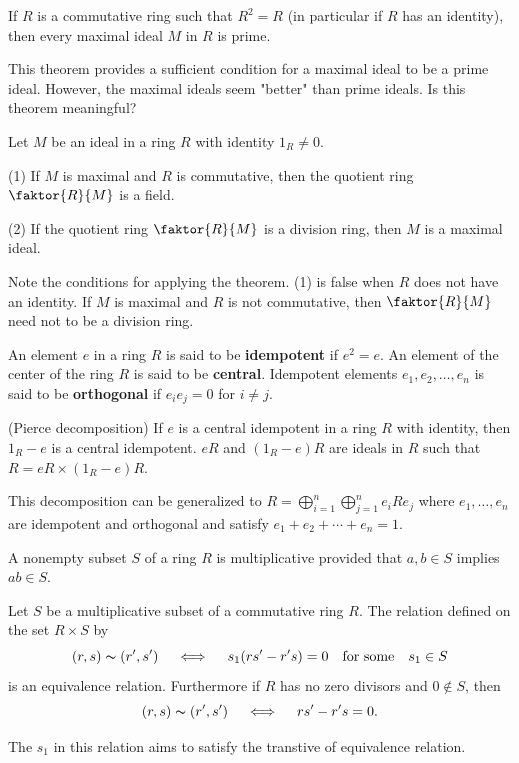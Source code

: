 \documentclass{article}
\begin{document}
\begin{theorem}
    If $R$ is a commutative ring such that $R^2=R$ (in particular if $R$ has an identity), then every maximal ideal $M$ in $R$ is prime.
\end{theorem}

This theorem provides a sufficient condition for a maximal ideal to be a prime ideal. However, the maximal ideals seem "better" than prime ideals. Is this theorem meaningful?

\begin{theorem}
    Let $M$ be an ideal in a ring $R$ with identity $1_R\neq 0$.

    (1) If $M$ is maximal and $R$ is commutative, then the quotient ring $\faktor{R}{M}$ is a field.

    (2) If the quotient ring $\faktor{R}{M}$ is a division ring, then $M$ is a maximal ideal.
\end{theorem}
Note the conditions for applying the theorem. (1) is false when $R$ does not have an identity. If $M$ is maximal and $R$ is not commutative, then $\faktor{R}{M}$ need not to be a division ring.

\begin{definition}
    An element $e$ in a ring $R$ is said to be \textbf{idempotent} if $e^2=e$. An element of the center of the ring $R$ is said to be \textbf{central}. Idempotent elements $e_1, e_{2}, \ldots, e_{n}$ is said to be \textbf{orthogonal} if $e_{i}e_{j}=0$ for $i\neq j$.
\end{definition}

\begin{theorem}(Pierce decomposition)
    If $e$ is a central idempotent in a ring $R$ with identity, then $1_R-e$ is a central idempotent. $eR$ and $(1_R-e)R$ are ideals in $R$ such that $R=eR\times (1_R-e)R$.
\end{theorem}
This decomposition can be generalized to $R=\bigoplus_{i=1}^{n}\bigoplus_{j=1}^{n} e_{i}R e_{j} $ where $e_{1}, \ldots,e_{n}$ are idempotent and orthogonal and satisfy $e_{1}+e_{2}+ \cdots+e_{n}=1$.


\begin{definition}
    A nonempty subset $S$ of a ring $R$ is multiplicative provided that $a,b \in S$ implies $ab \in S$.
\end{definition}

\begin{theorem}
    Let $S$ be a multiplicative subset of a commutative ring $R$. The relation defined on the set $R\times S$ by 
    \begin{equation*}
        (r,s)\thicksim (r',s') \quad\iff\quad s_{1}(rs'-r's)=0\quad \text{for some}\quad s_{1}\in S
    \end{equation*}
    is an equivalence relation. Furthermore if $R$ has no zero divisors and $0 \notin S$, then
    \begin{equation*}
        (r,s)\thicksim (r',s') \quad\iff\quad rs'-r's=0.
    \end{equation*}
\end{theorem}
The $s_{1}$ in this relation aims to satisfy the transtive of equivalence relation.
\end{document}
